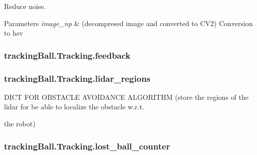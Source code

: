 Reduce noise. 


\begin{DoxyParams}{Parameters}
{\em image\+\_\+np} & (decompresed image and converted to C\+V2) Conversion to hsv \\
\hline
\end{DoxyParams}
\subsubsection[{\texorpdfstring{feedback}{feedback}}]{\setlength{\rightskip}{0pt plus 5cm}tracking\+Ball.\+Tracking.\+feedback}\hypertarget{classtrackingBall_1_1Tracking_a9d40ea04aba08e244a8edf175d659229}{}\label{classtrackingBall_1_1Tracking_a9d40ea04aba08e244a8edf175d659229}
\subsubsection[{\texorpdfstring{lidar\+\_\+regions}{lidar_regions}}]{\setlength{\rightskip}{0pt plus 5cm}tracking\+Ball.\+Tracking.\+lidar\+\_\+regions}\hypertarget{classtrackingBall_1_1Tracking_af4673dff355192ccd7cbd4e3676ef618}{}\label{classtrackingBall_1_1Tracking_af4673dff355192ccd7cbd4e3676ef618}


D\+I\+CT F\+OR O\+B\+S\+T\+A\+C\+LE A\+V\+O\+I\+D\+A\+N\+CE A\+L\+G\+O\+R\+I\+T\+HM (store the regions of the lidar for be able to localize the obstacle w.\+r.\+t. 

the robot) 
\subsubsection[{\texorpdfstring{lost\+\_\+ball\+\_\+counter}{lost_ball_counter}}]{\setlength{\rightskip}{0pt plus 5cm}tracking\+Ball.\+Tracking.\+lost\+\_\+ball\+\_\+counter}\hypertarget{classtrackingBall_1_1Tracking_a89db2b56bfd79bbbac1fd1af937e25f8}{}\label{classtrackingBall_1_1Tracking_a89db2b56bfd79bbbac1fd1af937e25f8}


